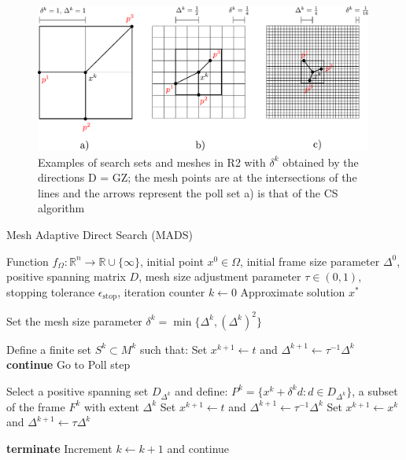 \begin{figure}[H]
	\centering
	\includegraphics[width=0.99\textwidth]{figures/mads.pdf}
	\caption{Examples of search sets and meshes in R2 with
		$\delta^k$  obtained by the directions D = GZ; the mesh points
		are at the intersections of the lines and the arrows represent
		the poll set a) is that of the CS algorithm}
	\label{fig:mads}
\end{figure}



\begin{algorithm}[H]
	\caption{Mesh Adaptive Direct Search (MADS)}\label{MADS}
	\begin{algorithmic}[1]
		\Require Function $f_{\Omega}: \mathbb{R}^n \to \mathbb{R} \cup \{\infty\}$, initial point $x^0 \in \Omega$, initial frame size parameter $\Delta^0$, positive spanning matrix $D$, mesh size adjustment parameter $\tau \in (0,1)$, stopping tolerance $\epsilon_{\text{stop}}$, iteration counter $k \gets 0$
		\Ensure Approximate solution $x^*$
		
		
		
		\State Set the mesh size parameter $\delta^k = \min \{\Delta^k, (\Delta^k)^2\}$
		
		\State Define a finite set $S^k \subset M^k$ such that:
		\State Set $x^{k+1} \gets t$ and $\Delta^{k+1} \gets \tau^{-1}\Delta^k$
		\State \textbf{continue}
		\Else
		\State Go to Poll step
		\EndIf
		
		\State Select a positive spanning set $D_{\Delta^k}$ and define:
		\State $P^k = \{x^k + \delta^k d : d \in D_{\Delta^k}\}$, a subset of the frame $F^k$ with extent $\Delta^k$
		\State Set $x^{k+1} \gets t$ and $\Delta^{k+1} \gets \tau^{-1}\Delta^k$
		\Else
		\State Set $x^{k+1} \gets x^k$ and $\Delta^{k+1} \gets \tau\Delta^k$
		\EndIf
		
		\State \textbf{terminate}
		\Else
		\State Increment $k \gets k+1$ and continue
		\EndIf
		
		\EndWhile
		\EndProcedure
	\end{algorithmic}
\end{algorithm}